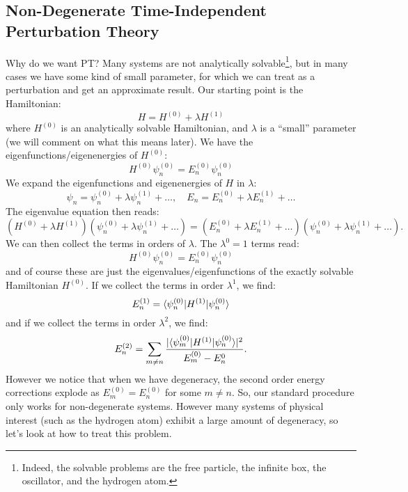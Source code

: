 \subsection{Non-Degenerate Time-Independent Perturbation Theory}
Why do we want PT? Many systems are not analytically solvable\footnote{Indeed, the solvable problems are the free particle, the infinite box, the oscillator, and the hydrogen atom.}, but in many cases we have some kind of small parameter, for which we can treat as a perturbation and get an approximate result. Our starting point is the Hamiltonian:
\begin{equation}
    H = H^{(0)} + \lambda H^{(1)}
\end{equation}
where $H^{(0)}$ is an analytically solvable Hamiltonian, and $\lambda$ is a ``small'' parameter (we will comment on what this means later). We have the eigenfunctions/eigenenergies of $H^{(0)}$:
\begin{equation}
    H^{(0)}\psi^{(0)}_n = E_n^{(0)}\psi_n^{(0)}
\end{equation}
We expand the eigenfunctions and eigenenergies of $H$ in $\lambda$:
\begin{equation}
    \psi_n = \psi_n^{(0)} + \lambda \psi_n^{(1)} + \ldots, \quad E_n = E_n^{(0)} + \lambda E_n^{(1)} + \ldots
\end{equation}
The eigenvalue equation then reads:
\begin{equation}\label{eq-pertexpansion}
    (H^{(0)} + \lambda H^{(1)})(\psi_n^{(0)} + \lambda \psi_n^{(1)} + \ldots) = (E_n^{(0)} + \lambda E_n^{(1)} + \ldots)(\psi_n^{(0)} + \lambda \psi_n^{(1)} + \ldots).
\end{equation}
We can then collect the terms in orders of $\lambda$. The $\lambda^0 = 1$ terms read:
\begin{equation}
    H^{(0)}\psi^{(0)}_n = E_n^{(0)}\psi_n^{(0)}
\end{equation}
and of course these are just the eigenvalues/eigenfunctions of the exactly solvable Hamiltonian $H^{(0)}$. If we collect the terms in order $\lambda^1$, we find:
\begin{equation}
    E_n^{(1)} = \langle \psi_n^{(0)} \rvert H^{(1)}\lvert \psi_n^{(0)} \rangle
\end{equation}
and if we collect the terms in order $\lambda^2$, we find:
\begin{equation}
    E_n^{(2)} = \sum_{m \neq n}\frac{\lvert \langle \psi_m^{(0)} \rvert H^{(1)}\lvert \psi_n^{(0)} \rangle \rvert^2}{E_m^{(0)} - E_n^{0}}.
\end{equation}
However we notice that when we have degeneracy, the second order energy corrections explode as $E_m^{(0)} = E_n^{(0)}$ for some $m \neq n$. So, our standard procedure only works for non-degenerate systems. However many systems of physical interest (such as the hydrogen atom) exhibit a large amount of degeneracy, so let's look at how to treat this problem.

